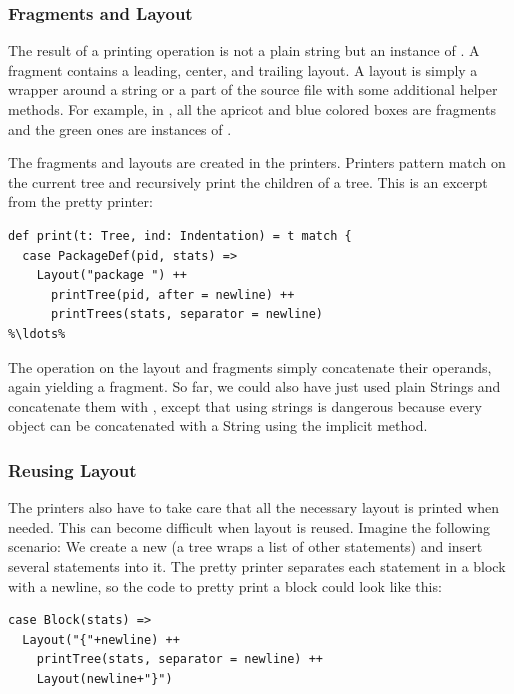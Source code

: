 \subsubsection{Fragments and Layout}

The result of a printing operation is not a plain string but an instance of . A fragment contains a leading, center, and trailing layout. A layout is simply a wrapper around a string or a part of the source file with some additional helper methods. For example, in , all the apricot and blue colored boxes are fragments and the green ones are instances of .

The fragments and layouts are created in the printers. Printers pattern match on the current tree and recursively print the children of a tree. This is an excerpt from the pretty printer:

\begin{lstlisting}
def print(t: Tree, ind: Indentation) = t match {
  case PackageDef(pid, stats) =>
    Layout("package ") ++ 
      printTree(pid, after = newline) ++ 
      printTrees(stats, separator = newline)
%\ldots%
\end{lstlisting}

The \src{++} operation on the layout and fragments simply concatenate their operands, again yielding a fragment. So far, we could also have just used plain Strings and concatenate them with \src{+}, except that using strings is dangerous because every object can be concatenated with a String using the implicit  method.

\subsubsection{Reusing Layout}

The printers also have to take care that all the necessary layout is printed when needed. This can become difficult when layout is reused. Imagine the following scenario: We create a new  (a  tree wraps a list of other statements) and insert several statements into it. The pretty printer separates each statement in a block with a newline, so the code to pretty print a block could look like this:

\begin{lstlisting}
case Block(stats) =>
  Layout("{"+newline) ++ 
    printTree(stats, separator = newline) ++ 
    Layout(newline+"}")
\end{lstlisting}

